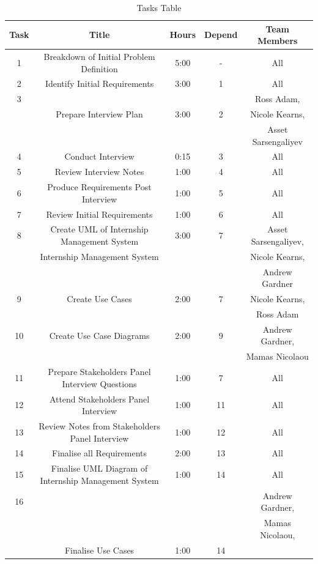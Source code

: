 \documentclass{l3deliverable}
\begin{document}
{\begin{table}
\caption{Tasks Table} %
\begin{tabular}{|c |c |c |c |c |} %
\hline\hline                        %
Task & Title & Hours & Depend & Team Members \\ [0.5ex]
\hline1 & Breakdown of Initial Problem Definition & 5:00 &-& All\\ %
\hline2 & Identify Initial Requirements & 3:00 &1& All\\
\hline3 & &  & & Ross Adam, \\
 &  Prepare Interview Plan&3:00 &2 &Nicole Kearns, \\
 & & & &Asset Sarsengaliyev \\
\hline4 & Conduct Interview & 0:15 &3& All\\
\hline5 & Review Interview Notes& 1:00 &4& All\\
\hline6 & Produce Requirements Post Interview & 1:00 &5& All\\
\hline7 & Review Initial Requirements & 1:00 &6& All \\
\hline8 & Create UML of Internship Management System & 3:00 &7 &Asset Sarsengaliyev, \\
&Internship Management System& & &Nicole Kearns,  \\
& & & & Andrew Gardner \\
\hline9  & Create Use Cases & 2:00&7 &Nicole Kearns,\\
 & & & & Ross Adam \\
\hline10  & Create Use Case Diagrams &2:00 &9 &  Andrew Gardner, \\
 & & & & Mamas Nicolaou \\
\hline11 & Prepare Stakeholders Panel Interview Questions & 1:00 &7& All\\
\hline12 & Attend Stakeholders Panel Interview & 1:00 &11& All\\
\hline13 & Review Notes from Stakeholders Panel Interview & 1:00 &12& All\\
\hline14 & Finalise all Requirements & 2:00 &13& All\\
\hline15 & Finalise UML Diagram of Internship Management System & 1:00 &14& All\\
\hline16 & &  & & Andrew Gardner, \\
 & & & & Mamas Nicolaou, \\
 & Finalise Use Cases & 1:00& 14& \\

\end{tabular}
\end{table}}
\end{document}

